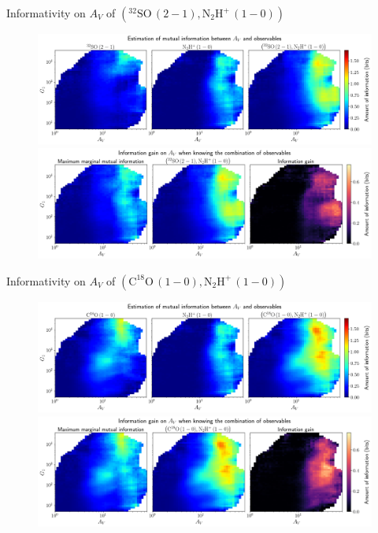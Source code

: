\documentclass{beamer}
\begin{document}
\begin{frame}{Informativity on $A_V$ of $\left(\mathrm{^{32}SO\,(2-1)},\mathrm{N_2H^+\,(1-0)}\right)$}
    \begin{figure}
        \centering
        \includegraphics[width=0.95\linewidth]{../mi/av__32so21_n2hp10_mi.png}
        \vfill
        \includegraphics[width=0.95\linewidth]{../mi/av__32so21_n2hp10_mi_gain.png}
    \end{figure}
\end{frame}

\begin{frame}{Informativity on $A_V$ of $\left(\mathrm{C^{18}O\,(1-0)},\mathrm{N_2H^+\,(1-0)}\right)$}
    \begin{figure}
        \centering
        \includegraphics[width=0.95\linewidth]{../mi/av__c18o10_n2hp10_mi.png}
        \vfill
        \includegraphics[width=0.95\linewidth]{../mi/av__c18o10_n2hp10_mi_gain.png}
    \end{figure}
\end{frame}
\end{document}
